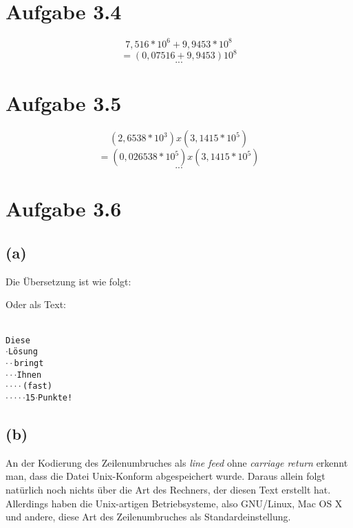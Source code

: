 \documentclass[12pt,a4paper]{article}
\newcommand\lin{{\tiny \ArrowBoldDownRight}}
\begin{document}
\section*{Aufgabe 3.4}
\[7,516 * 10^6 + 9,9453 * 10^8\]
\[= (0,07516 + 9,9453) 10^8\]
\[...\]

\section*{Aufgabe 3.5}
\[(2,6538 * 10^3) x (3,1415 * 10^5)\]
\[= (0,026538 * 10^5) x (3,1415 * 10^5)\]
\[...\]

\section*{Aufgabe 3.6}
\subsection*{(a)}
Die Übersetzung ist wie folgt:


Oder als Text:

\texttt{\lin \\
Diese \lin\\
$\cdot$Lösung \lin\\
$\cdot\cdot$bringt \lin\\
$\cdot\cdot\cdot$Ihnen \lin\\
$\cdot\cdot\cdot\cdot$(fast) \lin\\
$\cdot\cdot\cdot\cdot\cdot$15$\cdot$Punkte!}

\subsection*{(b)}
An der Kodierung des Zeilenumbruches als \textit{line feed} ohne \textit{carriage return} erkennt man, dass die Datei Unix-Konform abgespeichert wurde. Daraus allein folgt natürlich noch nichts über die Art des Rechners, der diesen Text erstellt hat. Allerdings haben die Unix-artigen Betriebsysteme, also GNU/Linux, Mac OS X und andere, diese Art des Zeilenumbruches als Standardeinstellung. 
\end{document}
